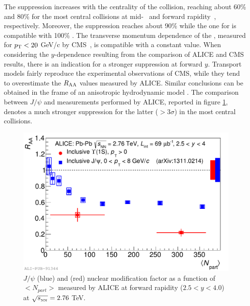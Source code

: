 The suppression increases with the centrality of the collision, reaching about 60\% and 80\% for the most central collisions at mid-~\cite{Khachatryan:2016xxp} and forward rapidity~\cite{Abelev:2014nua}, respectively. 
Moreover, the \upsiss suppression reaches about 90\% while the one for \upsisss is compatible with 100\% \cite{Khachatryan:2016xxp}. 
The transverse momentum dependence of the \upsis \raa, measured for $p_{\rm T}<20$ GeV/c by CMS~\cite{Khachatryan:2016xxp}, is compatible with a constant value. 
When considering the $y$-dependence resulting from the comparison of ALICE and CMS results, there is an indication for a stronger suppression at forward $y$.
Transport models \cite{Zhou:2014kka,Du:2017qkv} fairly reproduce the experimental observations of CMS, while they tend to overestimate the $R_{\rm AA}$ values measured by ALICE. 
Similar conclusions can be obtained in the frame of an anisotropic hydrodynamic model \cite{Krouppa:2017jlg}. 
The comparison between $J/\psi$ and \upsis measurements performed by ALICE, reported in figure \ref{fig:ALICE_jpsi_upsi}, denotes a much stronger suppression for the latter ($>3\sigma$) in the most central collisions.

\begin{figure}[!t]
\begin{center}
\includegraphics[width=0.8\linewidth]{Chapters/Analysis/Figs/2014-Dec-16-Raa_Jpsi_centr.pdf}
\caption{$J/\psi$ (blue) and \upsis (red) nuclear modification factor as a function of $<N_{part}>$ measured by ALICE at forward rapidity ($2.5<y<4.0$) at $\sqrt{s_{_{\rm NN}}}=2.76$ \rm{TeV}.}
\label{fig:ALICE_jpsi_upsi}
\end{center}
\end{figure}


